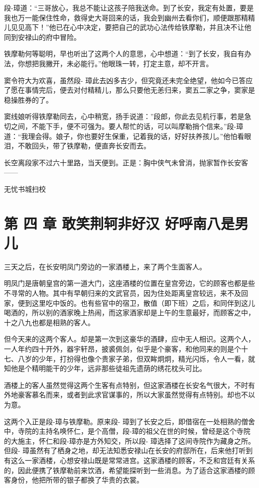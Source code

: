 \documentclass[12pt,oneside]{book}
\begin{document}
段-璋道：``三哥放心，我总不能让这孩子陪我送命。到了长安，我定有处置，要是我也万一能保住性命，救得史大哥回来的话，我会到幽州去看你们，顺便跟那精精儿见见高下！''他已在心中决定，要把自己的武功心法传给铁摩勒，并且决不让他同到安禄山的府中冒险。

铁摩勒何等聪明，早也听出了这两个人的意思，心中想道：``到了长安，我自有办法，你想把我撇开，未必能行。''他眼珠一转，打定主意，却不开言。

窦令符大为欢喜，虽然段-
璋此去凶多吉少，但究竟还未完全绝望，他如今已答应了愿在事情完后，便去对付精精儿，那么只要他无恙归来，窦五二家之争，窦家是稳操胜券的了。

窦线娘听得铁摩勒同去，心中稍宽，扬手说道：''段郎，你此去见机行事，若是急切之间，不能下手，便不可强为。要人帮忙的话，可以叫摩勒捎个信来。''段-璋道：``我理会得。娘子，你也要好生保重，记着我的话，好好扶养孩儿。''他怕看眼泪，不敢回头，带了铁摩勒，便直奔长安而去。

长空离段家不过六十里路，当天便到。正是：胸中侠气未曾消，抛家暂作长安客------

无忧书城扫校

\chapter{第 四 章 敢笑荆轲非好汉
好呼南八是男儿}\label{ux7b2c-ux56db-ux7ae0-ux6562ux7b11ux8346ux8f72ux975eux597dux6c49-ux597dux547cux5357ux516bux662fux7537ux513f}

三天之后，在长安明凤门旁边的一家酒楼上，来了两个生面客人。

明凤门是唐朝皇宫的第一道大门，这座酒楼的位置在皇宫旁边，它的顾客也都是些不寻常的人物。其中有早朝归来的文武官员，因为住处距离皇宫较远，来不及回家，便到这里吃中饭的。也有些官中的宿卫，散值（即下班）之后，和同伴到这儿喝酒的，所以别的酒家晚上热闹，而这家酒家却是上午的生意最好，而顾客之中，十之八九也都是相熟的客人。

但今天来的这两个客人。却是第一次到这豪华的酒肆，应中无人相识。这两个人，一人年约四十开外，器宇轩昂，披裘佩剑，似乎是个豪客，和他同来的则是个十七、八岁的少年，打扮得也像个贵家子弟，但双眸炯炯，精光闪烁，令人一看，就知他是个精明能干的少年，远非那些徒祖先遗荫的绣花枕头可比。

酒楼上的客人虽然觉得这两个生客有点特别，但这家酒楼在长安名气很大，不时有外地豪客慕名而来，或者到此求官谋事的，所以大家虽然觉得有点特别。却也不以为意。

这两个入正是段-璋与铁摩勒。原来段-
璋到了长安之后，即借宿在一处相熟的僧舍中，寺院的主持名唤怀仁，是个高僧，段-璋的祖父在世的时候，曾经是这个寺院的大施主，怀仁和段-璋亦是方外知交，所以段-
璋选择了这间寺院作为藏身之所。但段-
璋虽然有了栖身之地，却无法知悉安禄山在长安的府邸所在，后来他打听到有这么一家酒楼，心想安禄山既是常常进宫。这家酒楼的顾客，不乏和宫廷有关系的，因此便携了铁摩勒前来饮酒，希望能探听到一些消息。为了适合这家酒楼的顾客身份，他把所带的银子都换了华贵的衣裳。
\end{document}
